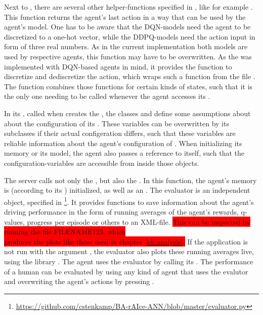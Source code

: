Next to , there are several other helper-functions specified in , like for example . This function returns the agent's last action in a way that can be used by the agent's model. One has to be aware that the DQN-models need the agent to be discretized to a one-hot vector, while the DDPQ-models need the action input in form of three real numbers. As in the current implementation both models are used by respective agents, this function may have to be overwritten. As the  was implemented with DQN-based agents in mind, it provides the function to discretize and dediscretize the action, which wraps such a function from the file . The function  combines those functions for certain kinds of states, such that it is the only one needing to be called whenever the agent accesses its .

In its , called when  creates the , the classes  and  define some assumptions about about the configuration of its . These variables can be overwritten by its subclasses if their actual configeration differs, such that these variables are reliable information about the agent's configuration of . When initializing its memory or its model, the agent also passes a reference to itself, such that the configuration-variables are accessible from inside those objects. 

The server calls not only the , but also the . In this function, the agent's memory is (according to its ) initialized, as well as an . The evaluator is an independent object, specified in \footnote{\url{https://github.com/cstenkamp/BA-rAIce-ANN/blob/master/evaluator.py}}. It provides functions to save information about the agent's driving performance in the form of running averages of the agent's rewards, q-values, progress per episode or others to an XML-file. \colorbox{red}{This can be inspected by running the file FILENAME123, which \\ produces the plots like those used in chapter~\ref{ch:analysis}.} If the application is not run with the argument , the evaluator also plots these running averages live, using the library . The agent uses the evaluator by calling its . The performance of a human can be evaluated by using any kind of agent that uses the evalutor and overwriting the agent's actions by pressing .

